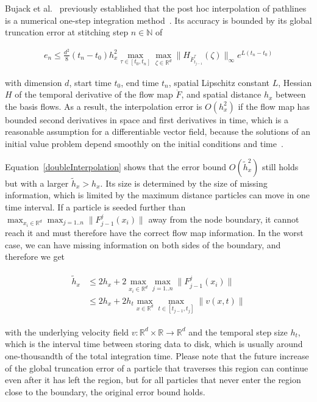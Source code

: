 %
Bujack et al.~\cite{bujack2015lagrangian} previously established that the post hoc interpolation 
of pathlines is a numerical one-step integration method~\cite{GH10}. 
%
Its accuracy is bounded by its global truncation error at stitching step $n\in\mathbb N$ of 
%
\begin{footnotesize}
\begin{equation}
\begin{aligned}\label{global}
e_{n}\leq\frac {d^2}8(t_n-t_0) h_x^2\max_{\tau\in[t_0,t_n]}\max_{\zeta\in\mathbb R^d}
\| H_{{\dot F}_{t_{j-1}}^{\tau}}(\zeta)\|_{\infty}e^{L(t_n-t_0)}
\end{aligned}
\end{equation}
\end{footnotesize}
%
with dimension $d$, start time $t_0$, end time $t_n$, spatial Lipschitz constant $L$, Hessian $H$ of the temporal derivative of the flow map $\dot F$, and spatial distance $h_x$ between the basis flows.
%
As a result, the interpolation error is $O(h_x^2)$ if the flow map has bounded second derivatives in space and first derivatives in time, which is a reasonable assumption for a differentiable vector field, because the solutions of an initial value problem depend smoothly on the initial conditions and time~\cite{hartman1973ordinary}.
%

Equation~\eqref{doubleInterpolation} shows that the error bound $O(\tilde h_x^2)$ still holds but with a larger $\tilde h_x>h_x$. 
%
Its size is determined by the size of missing information, which is limited by the maximum distance particles can move in one time interval.
%
If a particle is seeded further than $\max_{x_i\in\mathbb R^d} \max_{j=1..n} \| F_{j-1}^j(x_i)\|$ away from the node boundary, it cannot reach it and must therefore have the correct flow map information.
%
In the worst case, we can have missing information on both sides of the boundary, and therefore we get
%
\begin{footnotesize}
\begin{eqnarray}
\begin{aligned}\label{hx}
\tilde h_x&\leq 2h_x+2\max_{x_i\in\mathbb R^d} \max_{j=1..n} \| F_{j-1}^j(x_i)\|\\
&\leq 2h_x+2 h_t \max_{x\in\mathbb R^d} \max_{t\in[t_{j-1},t_j]}\| v(x,t)\|
\end{aligned}
\end{eqnarray}
\end{footnotesize}
%
with the underlying velocity field $v:\mathbb R^d \times \mathbb R \to \mathbb R^d$ and the temporal step size $h_t$, which is the interval time between storing data to disk, which is usually around one-thousandth of the total integration time.
%
Please note that the future increase of the global truncation error of a particle that traverses this region can continue even after it has left the region, but for all particles that never enter the region close to the boundary, the original error bound holds.
%

